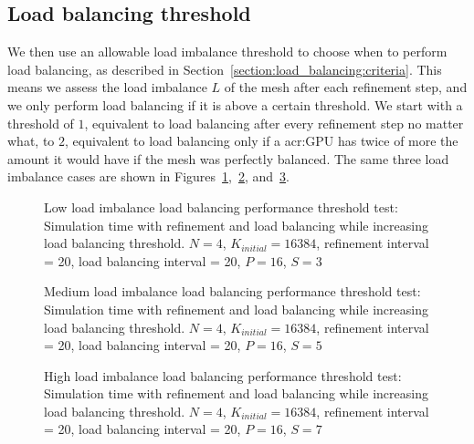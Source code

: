 \subsection{Load balancing threshold}\label{subsection:results:load_balancing_performance:threshold}

We then use an allowable load imbalance threshold to choose when to perform load balancing, as
described in Section~\ref{section:load_balancing:criteria}. This means we assess the load imbalance
\(L\) of the mesh after each refinement step, and we only perform load balancing if it is above a
certain threshold. We start with a threshold of \(1\), equivalent to load balancing after every
refinement step no matter what, to \(2\), equivalent to load balancing only if a \acrshort{acr:GPU}
has twice of more the amount it would have if the mesh was perfectly balanced. The same three load
imbalance cases are shown in
Figures~\ref{fig:load_balancing_efficiency_threshold_s3},~\ref{fig:load_balancing_efficiency_threshold_s5},
and~\ref{fig:load_balancing_efficiency_threshold_s7}.

\begin{figure}[H]
	\centering
	
	\caption{Low load imbalance load balancing performance threshold test: Simulation time with refinement and load balancing while increasing load balancing threshold. \(N = 4\), \(K_{initial} = 16384\), refinement interval = 20, load balancing interval = 20, \(P = 16\), \(S = 3\)}\label{fig:load_balancing_efficiency_threshold_s3}
\end{figure}

\begin{figure}[H]
	\centering
	
	\caption{Medium load imbalance load balancing performance threshold test: Simulation time with refinement and load balancing while increasing load balancing threshold. \(N = 4\), \(K_{initial} = 16384\), refinement interval = 20, load balancing interval = 20, \(P = 16\), \(S = 5\)}\label{fig:load_balancing_efficiency_threshold_s5}
\end{figure}

\begin{figure}[H]
	\centering
	
	\caption{High load imbalance load balancing performance threshold test: Simulation time with refinement and load balancing while increasing load balancing threshold. \(N = 4\), \(K_{initial} = 16384\), refinement interval = 20, load balancing interval = 20, \(P = 16\), \(S = 7\)}\label{fig:load_balancing_efficiency_threshold_s7}
\end{figure}

